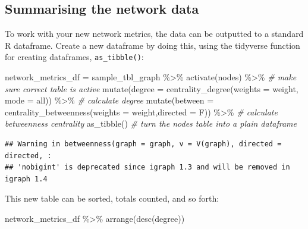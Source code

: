\documentclass[
]{book}
\newenvironment{Shaded}{\begin{snugshade}}{\end{snugshade}}
\newcommand{\AttributeTok}[1]{\textcolor[rgb]{0.77,0.63,0.00}{#1}}
\newcommand{\CommentTok}[1]{\textcolor[rgb]{0.56,0.35,0.01}{\textit{#1}}}
\newcommand{\FunctionTok}[1]{\textcolor[rgb]{0.00,0.00,0.00}{#1}}
\newcommand{\NormalTok}[1]{#1}
\newcommand{\OtherTok}[1]{\textcolor[rgb]{0.56,0.35,0.01}{#1}}
\newcommand{\SpecialCharTok}[1]{\textcolor[rgb]{0.00,0.00,0.00}{#1}}
\newcommand{\StringTok}[1]{\textcolor[rgb]{0.31,0.60,0.02}{#1}}
\begin{document}
\hypertarget{summarising-the-network-data}{%
\subsection{Summarising the network data}\label{summarising-the-network-data}}

To work with your new network metrics, the data can be outputted to a standard R dataframe. Create a new dataframe by doing this, using the tidyverse function for creating dataframes, \texttt{as\_tibble()}:

\begin{Shaded}
\begin{Highlighting}[]
\NormalTok{network\_metrics\_df }\OtherTok{=}\NormalTok{ sample\_tbl\_graph }\SpecialCharTok{\%\textgreater{}\%} 
  \FunctionTok{activate}\NormalTok{(nodes) }\SpecialCharTok{\%\textgreater{}\%} \CommentTok{\# make sure correct table is active}
  \FunctionTok{mutate}\NormalTok{(}\AttributeTok{degree =} \FunctionTok{centrality\_degree}\NormalTok{(}\AttributeTok{weights =}\NormalTok{ weight, }\AttributeTok{mode =} \StringTok{\textquotesingle{}all\textquotesingle{}}\NormalTok{)) }\SpecialCharTok{\%\textgreater{}\%} \CommentTok{\# calculate degree}
  \FunctionTok{mutate}\NormalTok{(}\AttributeTok{between =} \FunctionTok{centrality\_betweenness}\NormalTok{(}\AttributeTok{weights =}\NormalTok{ weight,}\AttributeTok{directed =}\NormalTok{ F)) }\SpecialCharTok{\%\textgreater{}\%}  \CommentTok{\# calculate betweenness centrality}
  \FunctionTok{as\_tibble}\NormalTok{() }\CommentTok{\# turn the nodes table into a plain dataframe}
\end{Highlighting}
\end{Shaded}

\begin{verbatim}
## Warning in betweenness(graph = graph, v = V(graph), directed = directed, :
## 'nobigint' is deprecated since igraph 1.3 and will be removed in igraph 1.4
\end{verbatim}

This new table can be sorted, totals counted, and so forth:

\begin{Shaded}
\begin{Highlighting}[]
\NormalTok{network\_metrics\_df }\SpecialCharTok{\%\textgreater{}\%} \FunctionTok{arrange}\NormalTok{(}\FunctionTok{desc}\NormalTok{(degree))}
\end{Highlighting}
\end{Shaded}
\end{document}
